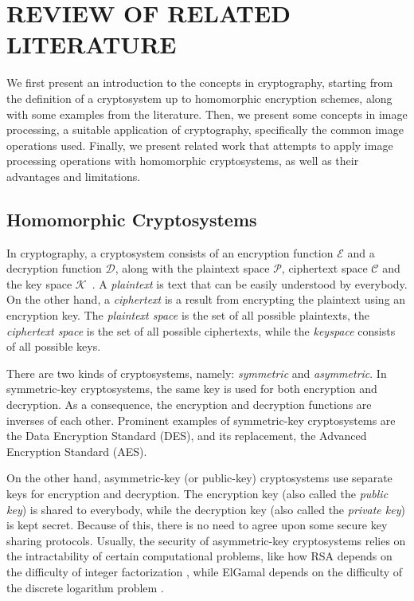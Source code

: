 \chapter{REVIEW OF RELATED LITERATURE}

We first present an introduction to the concepts in cryptography, starting from the definition of a cryptosystem up to homomorphic encryption schemes, along with some examples from the literature. Then, we present some concepts in image processing, a suitable application of cryptography, specifically the common image operations used. Finally, we present related work that attempts to apply image processing operations with homomorphic cryptosystems, as well as their advantages and limitations.

\section{Homomorphic Cryptosystems}

In cryptography, a cryptosystem consists of an encryption function $\mathcal{E}$ and a decryption function $\mathcal{D}$, along with the plaintext space $\mathcal{P}$, ciphertext space $\mathcal{C}$ and the key space $\mathcal{K}$~\cite{bauer_cryptosystem_2005}. A \textit{plaintext} is text that can be easily understood by everybody. On the other hand, a \textit{ciphertext} is a result from encrypting the plaintext using an encryption key. The \textit{plaintext space} is the set of all possible plaintexts, the \textit{ciphertext space} is the set of all possible ciphertexts, while the \textit{keyspace} consists of all possible keys.

There are two kinds of cryptosystems, namely: \textit{symmetric} and \textit{asymmetric}. In symmetric-key cryptosystems, the same key is used for both encryption and decryption. As a consequence, the encryption and decryption functions are inverses of each other. Prominent examples of symmetric-key cryptosystems are the Data Encryption Standard (DES), and its replacement, the Advanced Encryption Standard (AES).

On the other hand, asymmetric-key (or public-key) cryptosystems use separate keys for encryption and decryption. The encryption key (also called the \textit{public key}) is shared to everybody, while the decryption key (also called the \textit{private key}) is kept secret. Because of this, there is no need to agree upon some secure key sharing protocols. Usually, the security of asymmetric-key cryptosystems relies on the intractability of certain computational problems, like how RSA depends on the difficulty of integer factorization \cite{rivest_method_1978}, while ElGamal depends on the difficulty of the discrete logarithm problem \cite{blakley_public_1985}.

